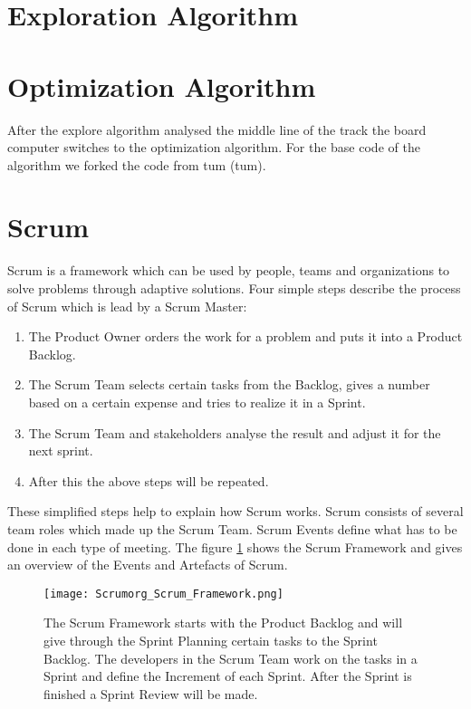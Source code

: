 \section{Exploration Algorithm}

\section{Optimization Algorithm}
After the explore algorithm analysed the middle line of the track the board computer switches to the optimization algorithm. For the base code of the algorithm we forked the code from \acrlong{tum} (\acrshort{tum}). \cite{tumftm_optimization_algoritm}

\section{Scrum}
Scrum is a framework which can be used by people, teams and organizations to solve problems through adaptive solutions. Four simple steps describe the process of Scrum which is lead by a Scrum Master:
\begin{enumerate}
    \item The Product Owner orders the work for a problem and puts it into a Product Backlog.
    \item The Scrum Team selects certain tasks from the Backlog, gives a number based on a certain expense and tries to realize it in a Sprint.
    \item The Scrum Team and stakeholders analyse the result and adjust it for the next sprint.
    \item After this the above steps will be repeated.
\end{enumerate}

These simplified steps help to explain how Scrum works. Scrum consists of several team roles which made up the Scrum Team. Scrum Events define what has to be done in each type of meeting. The figure \ref{fig:Scrum Framework} shows the Scrum Framework and gives an overview of the Events and Artefacts of Scrum. \cite{scrum_guide}


\begin{figure}[H]
    \centering
    \texttt{[image: Scrumorg\_Scrum\_Framework.png]}
    \caption{The Scrum Framework starts with the Product Backlog and will give through the Sprint Planning certain tasks to the Sprint Backlog. The developers in the Scrum Team work on the tasks in a Sprint and define the Increment of each Sprint. After the Sprint is finished a Sprint Review will be made. \cite{scrum_guide}}
    \label{fig:Scrum Framework}
\end{figure}


